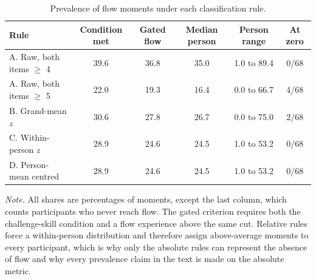 \begin{table}[!htbp]
\raggedright
\caption{Prevalence of flow moments under each classification rule.}
\label{tab:sup-prevalence}
\footnotesize
\begingroup
\setlength{\tabcolsep}{4pt}
\renewcommand{\arraystretch}{1.08}
\noindent
\begin{tabular*}{\textwidth}{@{\extracolsep{\fill}}lccccc@{}}
\toprule
Rule & Condition met & Gated flow & Median person & Person range & At zero \\
\midrule
A. Raw, both items $\geq$ 4 & 39.6 & 36.8 & 35.0 & 1.0 to 89.4 & 0/68 \\
A. Raw, both items $\geq$ 5 & 22.0 & 19.3 & 16.4 & 0.0 to 66.7 & 4/68 \\
B. Grand-mean $z$ & 30.6 & 27.8 & 26.7 & 0.0 to 75.0 & 2/68 \\
C. Within-person $z$ & 28.9 & 24.6 & 24.5 & 1.0 to 53.2 & 0/68 \\
D. Person-mean centred & 28.9 & 24.6 & 24.5 & 1.0 to 53.2 & 0/68 \\
\bottomrule
\end{tabular*}
\par\vspace{3pt}\noindent\parbox{\textwidth}{\footnotesize\textit{Note.} All shares are percentages of moments, except the last column, which counts participants who never reach flow. The gated criterion requires both the challenge-skill condition and a flow experience above the same cut. Relative rules force a within-person distribution and therefore assign above-average moments to every participant, which is why only the absolute rules can represent the absence of flow and why every prevalence claim in the text is made on the absolute metric.}
\endgroup
\end{table}
